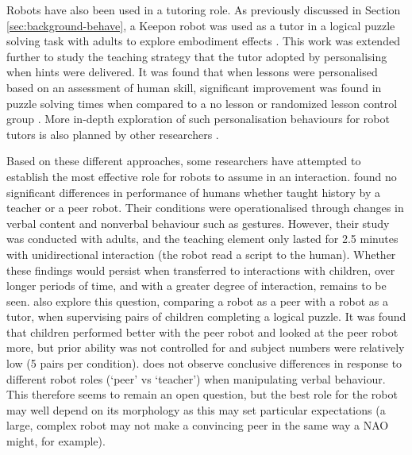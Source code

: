 Robots have also been used in a tutoring role. As previously discussed in Section \ref{sec:background-behave}, a Keepon robot was used as a tutor in a logical puzzle solving task with adults to explore embodiment effects \citep{leyzberg2012physical}. This work was extended further to study the teaching strategy that the tutor adopted by personalising when hints were delivered. It was found that when lessons were personalised based on an assessment of human skill, significant improvement was found in puzzle solving times when compared to a no lesson or randomized lesson control group \citep{leyzberg2014personalizing}. More in-depth exploration of such personalisation behaviours for robot tutors is also planned by other researchers \citep{charisi2015towards}.

Based on these different approaches, some researchers have attempted to establish the most effective role for robots to assume in an interaction. \cite{blancas2015effects} found no significant differences in performance of humans whether taught history by a teacher or a peer robot. Their conditions were operationalised through changes in verbal content and nonverbal behaviour such as gestures. However, their study was conducted with adults, and the teaching element only lasted for 2.5 minutes with unidirectional interaction (the robot read a script to the human). Whether these findings would persist when transferred to interactions with children, over longer periods of time, and with a greater degree of interaction, remains to be seen. \cite{zaga2015effect} also explore this question, comparing a robot as a peer with a robot as a tutor, when supervising pairs of children completing a logical puzzle. It was found that children performed better with the peer robot and looked at the peer robot more, but prior ability was not controlled for and subject numbers were relatively low (5 pairs per condition). \cite{diyas2016evaluating} does not observe conclusive differences in response to different robot roles (`peer' vs `teacher') when manipulating verbal behaviour. This therefore seems to remain an open question, but the best role for the robot may well depend on its morphology as this may set particular expectations (a large, complex robot may not make a convincing peer in the same way a NAO might, for example).

